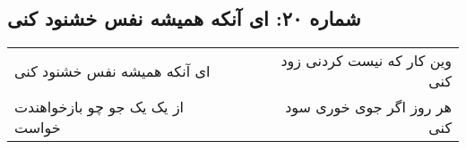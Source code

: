 \begin{center}
\section*{شماره ۲۰: ای آنکه همیشه نفس خشنود کنی}
\label{sec:020}
\begin{longtable}{l p{0.5cm} r}
ای آنکه همیشه نفس خشنود کنی
&&
وین کار که نیست کردنی زود کنی
\\
از یک یک جو چو بازخواهندت خواست
&&
هر روز اگر جوی خوری سود کنی
\\
\end{longtable}
\end{center}
